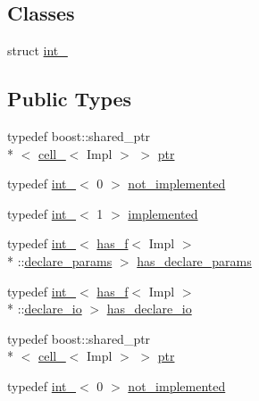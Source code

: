 \subsection*{Classes}
\begin{DoxyCompactItemize}
\item 
struct \hyperlink{structecto_1_1cell___1_1int__}{int\-\_\-}
\end{DoxyCompactItemize}
\subsection*{Public Types}
\begin{DoxyCompactItemize}
\item 
typedef boost\-::shared\-\_\-ptr\\*
$<$ \hyperlink{structecto_1_1cell__}{cell\-\_\-}$<$ Impl $>$ $>$ \hyperlink{structecto_1_1cell___a26d9e255a2ba0335c5e90fd04efa6bfa}{ptr}
\item 
typedef \hyperlink{structecto_1_1cell___1_1int__}{int\-\_\-}$<$ 0 $>$ \hyperlink{structecto_1_1cell___a3e48e52421d132bb2bb4e343f771abeb}{not\-\_\-implemented}
\item 
typedef \hyperlink{structecto_1_1cell___1_1int__}{int\-\_\-}$<$ 1 $>$ \hyperlink{structecto_1_1cell___a63c5c3dd95630a508017730ee345c23a}{implemented}
\item 
typedef \hyperlink{structecto_1_1cell___1_1int__}{int\-\_\-}$<$ \hyperlink{structecto_1_1has__f}{has\-\_\-f}$<$ Impl $>$\\*
\-::\hyperlink{structecto_1_1cell___a6a36edc8e9eddadfe6486460bab93c93}{declare\-\_\-params} $>$ \hyperlink{structecto_1_1cell___ab7b111eb2672ae4eaacc668852b8b89f}{has\-\_\-declare\-\_\-params}
\item 
typedef \hyperlink{structecto_1_1cell___1_1int__}{int\-\_\-}$<$ \hyperlink{structecto_1_1has__f}{has\-\_\-f}$<$ Impl $>$\\*
\-::\hyperlink{structecto_1_1cell___ac08370823fea8ed7f5991e369f6a7fa7}{declare\-\_\-io} $>$ \hyperlink{structecto_1_1cell___a10ab0d3f85e194d548beb3251416a569}{has\-\_\-declare\-\_\-io}
\item 
typedef boost\-::shared\-\_\-ptr\\*
$<$ \hyperlink{structecto_1_1cell__}{cell\-\_\-}$<$ Impl $>$ $>$ \hyperlink{structecto_1_1cell___a26d9e255a2ba0335c5e90fd04efa6bfa}{ptr}
\item 
typedef \hyperlink{structecto_1_1cell___1_1int__}{int\-\_\-}$<$ 0 $>$ \hyperlink{structecto_1_1cell___a3e48e52421d132bb2bb4e343f771abeb}{not\-\_\-implemented}

\end{DoxyCompactItemize}
